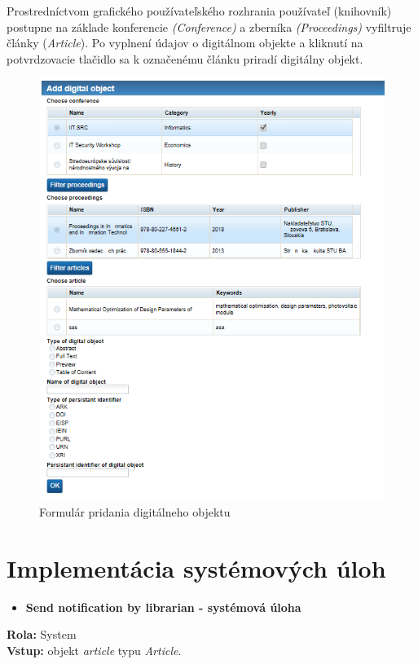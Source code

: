 \documentclass[10pt,oneside,slovak,a4paper]{article}
\begin{document}
Prostredníctvom grafického používateľského rozhrania používateľ (knihovník) postupne na základe konferencie \textit{(Conference)} a zberníka \textit{(Proceedings)} vyfiltruje články (\textit{Article}). Po vyplnení údajov o digitálnom objekte a kliknutí na potvrdzovacie tlačidlo sa k označenému článku priradí digitálny objekt.

\begin{figure} [H]
\centering
\includegraphics[scale=0.4]{forms/formAddDigital.png} 
\caption{Formulár pridania digitálneho objektu}
\end{figure}

\section{Implementácia systémových úloh}

\begin{itemize}
\item \textbf{Send notification by librarian - systémová úloha}
\end{itemize}

\textbf{Rola:} System\\
\textbf{Vstup:} objekt \textit{article} typu \textit{Article}.
\end{document}
